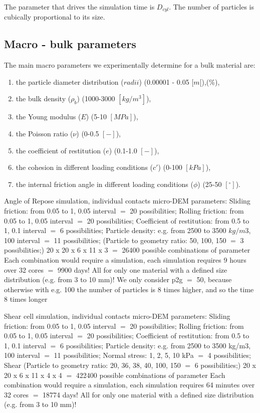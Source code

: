 The parameter that drives the simulation time is $D_{cyl}$. The number of particles is cubically proportional to its size. 

\subsection{Macro - bulk parameters}
\label{subsection:macroparameters}

The main macro parameters we experimentally determine for a bulk material are:

\begin{enumerate}[label=(\alph*)]
\item{the particle diameter distribution ($radii$) (0.00001 - 0.05 $[m[$),(\%),}
\item{the bulk density ($\rho_b$) (1000-3000 $[kg/m^3]$),}
\item{the Young modulus ($E$) (5-10 $[MPa]$),}
\item{the Poisson ratio ($\nu$) (0-0.5 $[-]$),}
\item{the coefficient of restitution ($e$) (0.1-1.0 $[-]$),}
\item{the cohesion in different loading conditions ($c'$) (0-100 $[kPa]$),}
\item{the internal friction angle in different loading conditions ($\phi$) (25-50 $[^\circ]$).}
\end{enumerate}

Angle of Repose simulation, individual contacts micro-DEM parameters:
Sliding friction: from 0.05 to 1, 0.05 interval $=$ 20 possibilities;
Rolling friction: from 0.05 to 1, 0.05 interval $=$ 20 possibilities;
Coefficient  of restitution: from 0.5 to 1, 0.1 interval $=$ 6 possibilities;
Particle density: e.g. from 2500 to 3500 $kg/m3$, 100 interval $=$ 11 possibilities;
(Particle to geometry ratio: 50, 100, 150 $=$ 3 possibilities;)
20 x 20 x 6 x 11 x 3 $=$ 26400 possible combinations of parameter
Each combination would require a simulation, each simulation requires 9 hours over 32 cores $=$ 9900 days!
All for only one material with a defined size distribution (e.g. from 3 to 10 mm)!
We only consider p2g $=$ 50, because otherwise with e.g. 100 the number of particles is 8 times higher, and so the time 8 times longer

Shear cell simulation, individual contacts micro-DEM parameters:
Sliding friction: from 0.05 to 1, 0.05 interval $=$ 20 possibilities;
Rolling friction: from 0.05 to 1, 0.05 interval $=$ 20 possibilities;
Coefficient  of restitution: from 0.5 to 1, 0.1 interval $=$ 6 possibilities;
Particle density: e.g. from 2500 to 3500 kg/m3, 100 interval $=$ 11 possibilities;
Normal stress: 1, 2, 5, 10 kPa $=$ 4 possibilities;
Shear %
(Particle to geometry ratio: 20, 36, 38, 40, 100, 150 $=$ 6 possibilities;)
20 x 20 x 6 x 11 x 4 x 4 $=$ 422400 possible combinations of parameter
Each combination would require a simulation, each simulation requires 64 minutes over 32 cores $=$ 18774 days!
All for only one material with a defined size distribution (e.g. from 3 to 10 mm)!


